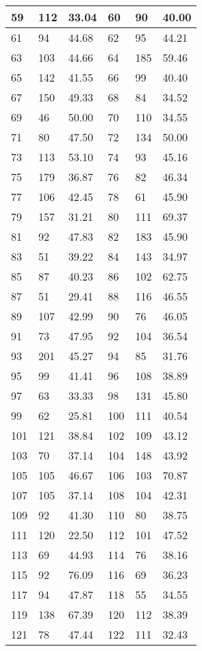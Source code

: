 {\begin{longtable}{|p{3cm}|p{3cm}|p{3cm}|p{3cm}|p{3cm}|p{3cm}|}
59 & 112& 33.04 & 60 & 90& 40.00\\
\hline
61 & 94& 44.68 & 62 & 95& 44.21\\
\hline
63 & 103& 44.66 & 64 & 185& 59.46\\
\hline
65 & 142& 41.55 & 66 & 99& 40.40\\
\hline
67 & 150& 49.33 & 68 & 84& 34.52\\
\hline
69 & 46& 50.00 & 70 & 110& 34.55\\
\hline
71 & 80& 47.50 & 72 & 134& 50.00\\
\hline
73 & 113& 53.10 & 74 & 93& 45.16\\
\hline
75 & 179& 36.87 & 76 & 82& 46.34\\
\hline
77 & 106& 42.45 & 78 & 61& 45.90\\
\hline
79 & 157& 31.21 & 80 & 111& 69.37\\
\hline
81 & 92& 47.83 & 82 & 183& 45.90\\
\hline
83 & 51& 39.22 & 84 & 143& 34.97\\
\hline
85 & 87& 40.23 & 86 & 102& 62.75\\
\hline
87 & 51& 29.41 & 88 & 116& 46.55\\
\hline
89 & 107& 42.99 & 90 & 76& 46.05\\
\hline
91 & 73& 47.95 & 92 & 104& 36.54\\
\hline
93 & 201& 45.27 & 94 & 85& 31.76\\
\hline
95 & 99& 41.41 & 96 & 108& 38.89\\
\hline
97 & 63& 33.33 & 98 & 131& 45.80\\
\hline
99 & 62& 25.81 & 100 & 111& 40.54\\
\hline
101 & 121& 38.84 & 102 & 109& 43.12\\
\hline
103 & 70& 37.14 & 104 & 148& 43.92\\
\hline
105 & 105& 46.67 & 106 & 103& 70.87\\
\hline
107 & 105& 37.14 & 108 & 104& 42.31\\
\hline
109 & 92& 41.30 & 110 & 80& 38.75\\
\hline
111 & 120& 22.50 & 112 & 101& 47.52\\
\hline
113 & 69& 44.93 & 114 & 76& 38.16\\
\hline
115 & 92& 76.09 & 116 & 69& 36.23\\
\hline
117 & 94& 47.87 & 118 & 55& 34.55\\
\hline
119 & 138& 67.39 & 120 & 112& 38.39\\
\hline
121 & 78& 47.44 & 122 & 111& 32.43\\

\end{longtable}}
